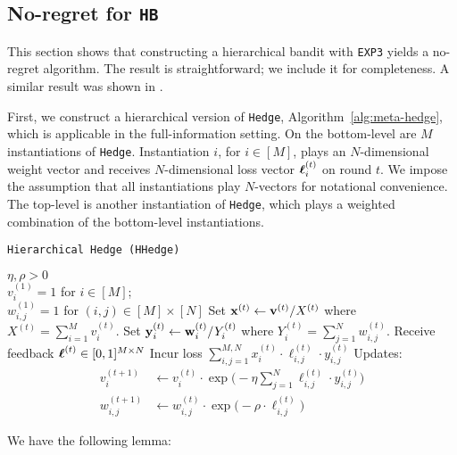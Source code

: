 \subsection{No-regret for \texttt{HB}}
\label{sec:bound}

This section shows that constructing a hierarchical bandit with \texttt{EXP3} yields a no-regret algorithm. The result is straightforward; we include it for completeness. A similar result was shown in \cite{chang:05}. 

First, we construct a hierarchical version of \texttt{Hedge}, Algorithm~\ref{alg:meta-hedge}, which is applicable in the full-information setting. On the bottom-level are $M$ instantiations of \texttt{Hedge}. Instantiation $i$, for $i\in[M]$, plays an $N$-dimensional weight vector and receives $N$-dimensional loss vector $\boldsymbol\ell^{(t)}_{i}$ on round $t$. We impose the assumption that all instantiations play $N$-vectors for notational convenience. The top-level is another instantiation of \texttt{Hedge}, which plays a weighted combination of the bottom-level instantiations.

\begin{algorithm}[tb]
   \caption{\texttt{Hierarchical Hedge (HHedge)}}
   \label{alg:meta-hedge}
   \begin{algorithmic}   
   	 $\eta,\rho>0$\\
   	 $v^{(1)}_{i}=1$ for $i\in[M]$;\\ 
   	 $w^{(1)}_{i,j}=1$ for $(i,j)\in[M]\times[N]$
	\STATE Set ${\mathbf x}^{(t)} \leftarrow {\mathbf v}^{(t)}/X^{(t)}$ where $X^{(t)} = \sum_{i=1}^M v^{(t)}_{i}$.
	\STATE Set ${\mathbf y}^{(t)}_{i} \leftarrow {\mathbf w}^{(t)}_{i}/Y^{(t)}_{i}$ where $Y^{(t)}_{i} = \sum_{j=1}^N w^{(t)}_{i,j}$.
	\STATE Receive feedback $\boldsymbol\ell^{(t)}\in [0,1]^{M\times N}$ 
	\STATE Incur loss $\sum_{i,j=1}^{M,N} x^{(t)}_{i}\cdot\ell^{(t)}_{i,j}\cdot y^{(t)}_{i,j}$
	\STATE Updates:
	\begin{align}
		v^{(t+1)}_i & \leftarrow v^{(t)}_{i}\cdot \exp\big(-\eta \sum_{j=1}^N\ell^{(t)}_{i,j}\cdot y^{(t)}_{i,j}\big)
		\\
		w^{(t+1)}_{i,j} & \leftarrow w^{(t)}_{i,j}\cdot \exp\big(-\rho\cdot \ell^{(t)}_{i,j}\big)
	\end{align}
   	\ENDFOR
   	\end{algorithmic}
\end{algorithm}

We have the following lemma:

